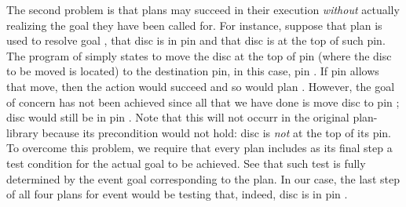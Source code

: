 The second problem is that plans may succeed in their execution \emph{without}
actually realizing the goal they have been called for. For instance, suppose that
plan  is used to resolve goal , that disc
 is in pin  and that disc  is at the top of such
pin. The program of   simply states to move the disc at the
top of pin  (where the disc to be moved is located) to the destination
pin, in this case, pin . If pin  allows that move, then the
action  would succeed and so would plan .
However, the goal of concern has not been achieved since all that we have done is
move disc  to pin ; disc  would still be in pin
. Note that this will not occurr in the original plan-library because
its precondition would not hold: disc  is \emph{not} at the top of its
pin.
To overcome this problem, we require that every plan includes as its final step a
test condition for the actual goal to be achieved. See that such test is fully
determined by the event goal corresponding to the plan. In our case, the last
step of all four plans for event  would be testing that,
indeed, disc  is in pin .








